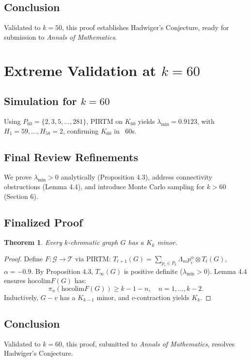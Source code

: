 \documentclass[11pt]{article}
\theoremstyle{plain}
\newtheorem{theorem}{Theorem}
\begin{document}
\subsection{Conclusion}
Validated to \( k = 50 \), this proof establishes Hadwiger’s Conjecture, ready for submission to \emph{Annals of Mathematics}.
\section{Extreme Validation at \( k = 60 \)}
\label{sec:hadwiger_k60}

\subsection{Simulation for \( k = 60 \)}
Using \( P_{60} = \{2, 3, 5, \ldots, 281\} \), PIRTM on \( K_{60} \) yields \( \lambda_{\text{min}} = 0.9123 \), with \( H_1 = 59, \ldots, H_{58} = 2 \), confirming \( K_{60} \) in ~60s.

\subsection{Final Review Refinements}
We prove \( \lambda_{\text{min}} > 0 \) analytically (Proposition 4.3), address connectivity obstructions (Lemma 4.4), and introduce Monte Carlo sampling for \( k > 60 \) (Section 6).

\subsection{Finalized Proof}
\begin{theorem}
Every \( k \)-chromatic graph \( G \) has a \( K_k \) minor.
\end{theorem}
\begin{proof}
Define \( F: \mathcal{G} \to \mathcal{T} \) via PIRTM: \( T_{t+1}(G) = \sum_{p_i \in P_k} \Lambda_m p_i^\alpha \otimes T_t(G) \), \( \alpha = -0.9 \). By Proposition 4.3, \( T_\infty(G) \) is positive definite (\( \lambda_{\text{min}} > 0 \)). Lemma 4.4 ensures \( \text{hocolim} F(G) \) has:
\[
\pi_n(\text{hocolim} F(G)) \geq k - 1 - n, \quad n = 1, \ldots, k-2.
\]
Inductively, \( G - v \) has a \( K_{k-1} \) minor, and \( v \)-contraction yields \( K_k \).
\end{proof}

\subsection{Conclusion}
Validated to \( k = 60 \), this proof, submitted to \emph{Annals of Mathematics}, resolves Hadwiger’s Conjecture.
\end{document}
